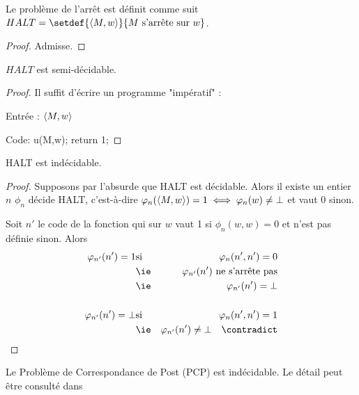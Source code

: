 \begin{definition}
	Le problème de l'arrêt est définit comme suit $HALT = \setdef {\encode{M,w}} {M \text{ s'arrête sur } w}$.
\end{definition}

\begin{proof}
	Admisse.
\end{proof}

\begin{prop}
	$HALT$ est semi-décidable.
\end{prop}

\begin{proof}
	Il suffit d'écrire un programme "impératif" :

	Entrée : $\left\langle M,w\right\rangle$

	Code:
	u(M,w);
	return 1;

\end{proof}

\begin{prop}
	HALT est indécidable.
\end{prop}

\begin{proof}
	Supposons par l'absurde que HALT est décidable. Alors il existe un entier $n$ \tq $\phi_n$ décide HALT, c'est-à-dire
	$ \varphi_n(\left\langle M, w\right\rangle ) = 1 \iff \varphi_n(w) \neq \bot $ et vaut $0$ sinon.

	Soit $n'$ le code de la fonction qui sur $w$ vaut 1 si $\phi_n (w,w) = 0 $ et n'est pas définie sinon. Alors
	\begin{eqnarray*}
		\phi_{n'}(n') = 1 & \text{si} & \phi_n(n',n') = 0\\
		&\text{\ie}& \phi_{n'}(n') \text{ ne s'arrête pas} \\
		&\text{\ie}& \phi_{n'}(n') = \bot\\\\
		\phi_{n'}(n') = \bot & \text{si} & \phi_n(n',n') = 1\\
		&\text{\ie}& \phi_{n'}(n') \neq \bot \quad \contradict
	\end{eqnarray*}
\end{proof}

\begin{exemple}
    Le Problème de Correspondance de Post (PCP) est indécidable. Le détail peut être consulté dans \cite[Chapter~5.2]{sipser}
\end{exemple}
